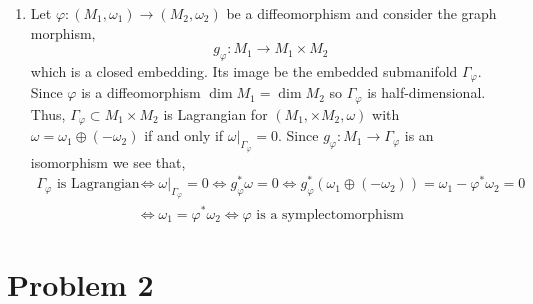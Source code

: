 \documentclass[12pt]{article}
\begin{document}
\begin{enumerate}
\item Let $\varphi : (M_1, \omega_1) \to (M_2, \omega_2)$ be a diffeomorphism and consider the graph morphism,
\[ g_\varphi : M_1 \to M_1 \times M_2 \]
which is a closed embedding. Its image be the embedded submanifold $\Gamma_\varphi$. Since $\varphi$ is a diffeomorphism $\dim{M_1} = \dim{M_2}$ so $\Gamma_\varphi$ is half-dimensional. Thus, $\Gamma_\varphi \subset M_1 \times M_2$ is Lagrangian for $(M_1, \times M_2, \omega)$ with $\omega = \omega_1 \oplus (-\omega_2)$ if and only if $\omega|_{\Gamma_\varphi} = 0$. Since $g_{\varphi} : M_1 \to \Gamma_{\varphi}$ is an isomorphism we see that,
\begin{align*}
\Gamma_{\varphi} \text{ is Lagrangian} & \iff \omega|_{\Gamma_{\varphi}} = 0 \iff g_{\varphi}^* \omega = 0 \iff g_\varphi^* (\omega_1 \oplus (-\omega_2)) = \omega_1 - \varphi^* \omega_2 = 0
\\
&  \iff \omega_1 = \varphi^* \omega_2 \iff \varphi \text{ is a symplectomorphism} 
\end{align*}
\end{enumerate}

\section{Problem 2}
\end{document}
